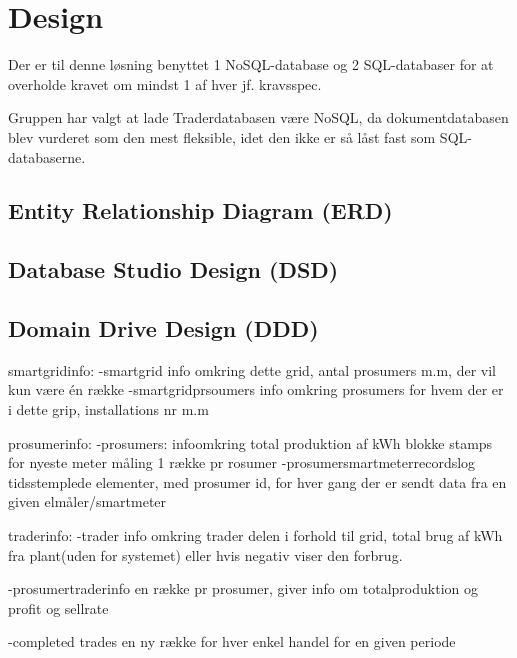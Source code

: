 
\section{Design}

Der er til denne løsning benyttet 1 NoSQL-database og 2 SQL-databaser for at overholde kravet om mindst 1 af hver jf. kravsspec.

Gruppen har valgt at lade Traderdatabasen være NoSQL, da dokumentdatabasen blev vurderet som den mest fleksible, idet den ikke er så låst fast som SQL-databaserne.

\subsection{Entity Relationship Diagram (ERD)}

\subsection{Database Studio Design (DSD)}

\subsection{Domain Drive Design (DDD)}





smartgridinfo:
-smartgrid
    info omkring dette grid, antal prosumers m.m, der vil kun være én række
-smartgridprsoumers
    info omkring prosumers for hvem der er i dette grip, installations nr m.m

prosumerinfo:
-prosumers:
    infoomkring total produktion af kWh blokke
    stamps for nyeste meter måling 1 række pr rosumer
-prosumersmartmeterrecordslog
    tidsstemplede elementer, med prosumer id, for hver gang der er sendt data fra en given elmåler/smartmeter


traderinfo:
-trader
    info omkring trader delen i forhold til grid, total brug af kWh fra plant(uden for systemet) eller hvis negativ viser den forbrug. 

-prosumertraderinfo
    en række pr prosumer, giver info om totalproduktion og profit og sellrate

-completed trades
    en ny række for hver enkel handel for en given periode
